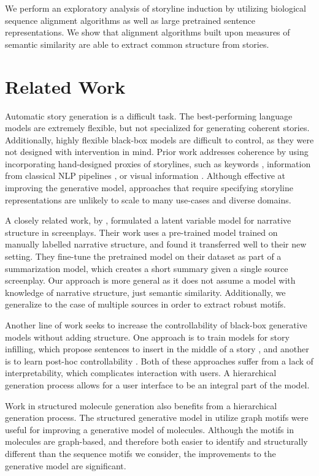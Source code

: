 \documentclass{article}
\begin{document}
We perform an exploratory analysis of storyline induction by utilizing 
biological sequence alignment algorithms as well as large pretrained sentence representations.
We show that alignment algorithms built upon measures of semantic similarity 
are able to extract common structure from stories.

\section{Related Work}
Automatic story generation is a difficult task.
The best-performing language models are extremely flexible, but not specialized
for generating coherent stories.
Additionally, highly flexible black-box models are difficult to control,
as they were not designed with intervention in mind.
Prior work addresses coherence by using incorporating hand-designed proxies
of storylines, such as keywords \citep{yao2018storyline,ippolito2019rarewords},
information from classical NLP pipelines \citep{fan2019structure},
or visual information \citep{chandu2020narrative}.
Although effective at improving the generative model,
approaches that require specifying storyline representations
are unlikely to scale to many use-cases and diverse domains.

A closely related work, by \citet{papalampidi2020screenplay}, 
formulated a latent variable model for narrative structure in screenplays.
Their work uses a pre-trained model trained on manually labelled 
narrative structure, and found it transferred well to their new setting.
They fine-tune the pretrained model on their dataset as part of a 
summarization model, which creates a short summary given a single source screenplay.
Our approach is more general as it does not assume a model with knowledge of 
narrative structure, just semantic similarity.
Additionally, we generalize to the case of multiple sources in 
order to extract robust motifs.

Another line of work seeks to increase the controllability of black-box
generative models without adding structure.
One approach is to train models for story infilling,
which propose sentences to insert in the middle of a story \citep{ippolito2019infill},
and another is to learn post-hoc controllability \citep{uber2019plug}.
Both of these approaches suffer from a lack of interpretability,
which complicates interaction with users.
A hierarchical generation process allows for a user interface
to be an integral part of the model.

Work in structured molecule generation also benefits from a 
hierarchical generation process.
The structured generative model in \citet{wengong2020moleculemotif}
utilize graph motifs were useful for improving a generative model of molecules.
Although the motifs in molecules are graph-based, and therefore both
easier to identify and structurally different than the sequence motifs we consider,
the improvements to the generative model are significant.
\end{document}
